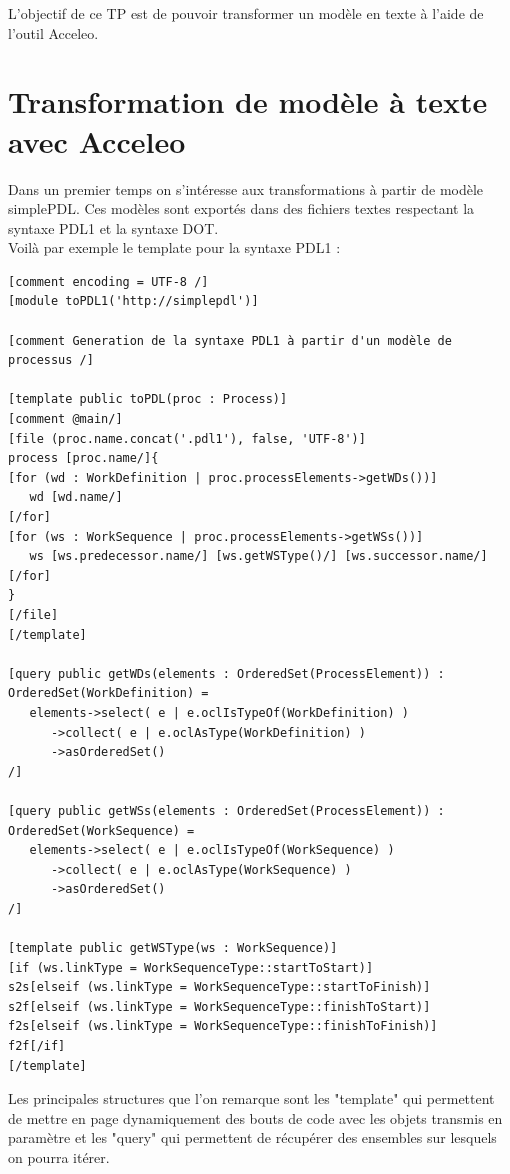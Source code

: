 L'objectif de ce TP est de pouvoir transformer un modèle en texte à l'aide de l'outil Acceleo.

\section{Transformation de modèle à texte avec Acceleo}

Dans un premier temps on s'intéresse aux transformations à partir de modèle simplePDL.
Ces modèles sont exportés dans des fichiers textes respectant la syntaxe PDL1 et la syntaxe DOT.\\

Voilà par exemple le template pour la syntaxe PDL1 :\\

\begin{lstlisting}[caption=toPDL1.mtl]
[comment encoding = UTF-8 /]
[module toPDL1('http://simplepdl')]

[comment Generation de la syntaxe PDL1 à partir d'un modèle de processus /]

[template public toPDL(proc : Process)]
[comment @main/]
[file (proc.name.concat('.pdl1'), false, 'UTF-8')]
process [proc.name/]{
[for (wd : WorkDefinition | proc.processElements->getWDs())]
   wd [wd.name/]
[/for]
[for (ws : WorkSequence | proc.processElements->getWSs())]
   ws [ws.predecessor.name/] [ws.getWSType()/] [ws.successor.name/]
[/for]
}
[/file]
[/template]

[query public getWDs(elements : OrderedSet(ProcessElement)) : OrderedSet(WorkDefinition) = 
   elements->select( e | e.oclIsTypeOf(WorkDefinition) )
      ->collect( e | e.oclAsType(WorkDefinition) )
      ->asOrderedSet()
/]

[query public getWSs(elements : OrderedSet(ProcessElement)) : OrderedSet(WorkSequence) = 
   elements->select( e | e.oclIsTypeOf(WorkSequence) )
      ->collect( e | e.oclAsType(WorkSequence) )
      ->asOrderedSet()
/]

[template public getWSType(ws : WorkSequence)]
[if (ws.linkType = WorkSequenceType::startToStart)]
s2s[elseif (ws.linkType = WorkSequenceType::startToFinish)]
s2f[elseif (ws.linkType = WorkSequenceType::finishToStart)]
f2s[elseif (ws.linkType = WorkSequenceType::finishToFinish)]
f2f[/if]
[/template]

\end{lstlisting}

Les principales structures que l'on remarque sont les "template" qui permettent de mettre en page dynamiquement des bouts de code avec les objets transmis en paramètre et les "query" qui permettent de récupérer des ensembles sur lesquels on pourra itérer.\\

